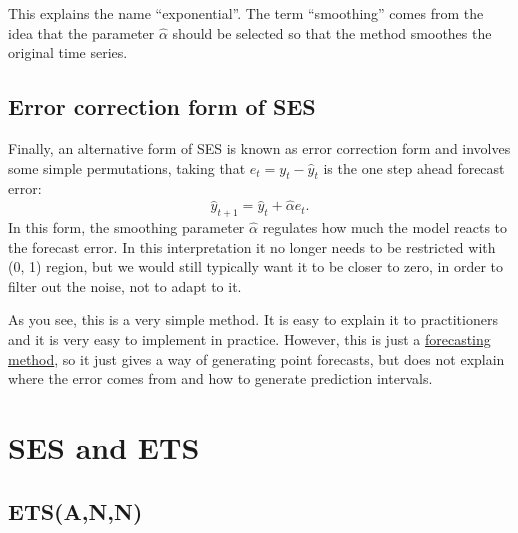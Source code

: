 \documentclass[
]{book}
\theoremstyle{definition}
\theoremstyle{definition}
\theoremstyle{definition}
\theoremstyle{definition}
\theoremstyle{remark}
\begin{document}
This explains the name ``exponential''. The term ``smoothing'' comes from the idea that the parameter \(\hat{\alpha}\) should be selected so that the method smoothes the original time series.

\hypertarget{error-correction-form-of-ses}{%
\subsection{Error correction form of SES}\label{error-correction-form-of-ses}}

Finally, an alternative form of SES is known as error correction form and involves some simple permutations, taking that \(e_t=y_t-\hat{y}_t\) is the one step ahead forecast error:
\begin{equation}
  \hat{y}_{t+1} = \hat{y}_{t} + \hat{\alpha} e_{t}.
  \label{eq:SESErrorCorrection}
\end{equation}
In this form, the smoothing parameter \(\hat{\alpha}\) regulates how much the model reacts to the forecast error. In this interpretation it no longer needs to be restricted with (0, 1) region, but we would still typically want it to be closer to zero, in order to filter out the noise, not to adapt to it.

As you see, this is a very simple method. It is easy to explain it to practitioners and it is very easy to implement in practice. However, this is just a \protect\hyperlink{intro}{forecasting method}, so it just gives a way of generating point forecasts, but does not explain where the error comes from and how to generate prediction intervals.

\hypertarget{SESandETS}{%
\section{SES and ETS}\label{SESandETS}}

\hypertarget{etsann}{%
\subsection{ETS(A,N,N)}\label{etsann}}
\end{document}
